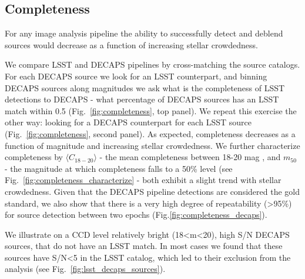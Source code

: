 \documentclass[DM,lsstdraft,toc,usenatbib]{lsstdoc}
\begin{document}
\subsection{Completeness}
For any image analysis pipeline the ability to successfully detect and deblend sources  would decrease as a function of increasing stellar crowdedness. 

We compare LSST and DECAPS pipelines  by cross-matching the source catalogs. For each DECAPS source we look for an LSST counterpart, and binning DECAPS sources along magnitudes we ask what is the completeness of LSST detections to DECAPS - what percentage of DECAPS sources has an LSST match within 0.5  \arcsec(Fig.~\ref{fig:completeness}, top panel). We repeat this exercise the other way: looking for a DECAPS counterpart for each LSST source (Fig.~\ref{fig:completeness}, second panel). As expected, completeness decreases as a function of magnitude and increasing stellar crowdedness. We further characterize completeness by $\langle C_{18-20} \rangle$ - the mean completeness between 18-20 mag , and $m_{50}$ - the magnitude at which completeness falls to a 50\% level (see Fig.~\ref{fig:completeness_characterize} - both exhibit a slight trend with stellar crowdedness. Given that the DECAPS pipeline detections are considered the gold standard, we also show that there is a very high degree of repeatability (>95\%) for source detection between two epochs (Fig.\ref{fig:completeness_decaps}). 

We illustrate on a CCD level relatively bright (18<m<20), high S/N DECAPS sources, that do not have an LSST match. In most cases  we found that these sources have S/N<5 in the LSST catalog, which led to their exclusion from the analysis (see Fig.~\ref{fig:lsst_decaps_sources}).
\end{document}
